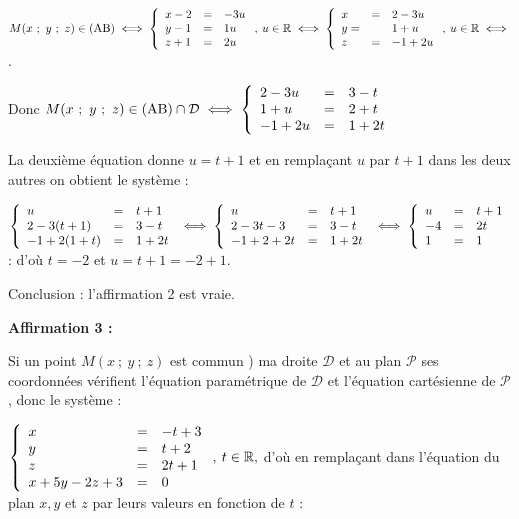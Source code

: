 \documentclass[10pt]{article}
\providecommand{\R}{\mathbb{R}}
\begin{document}
$M(x~;~y~;~z) \in (\text{AB}) \iff \left\{\begin{array}{l c l}
x - 2 &=& -3u\\
y - 1&=&1u\\
z + 1 &=&2u
\end{array}\right., \: u \in \R \iff \left\{\begin{array}{l c l}
x &=& 2  -3u\\
y =& &1 + u\\
z &=&- 1 + 2u
\end{array}\right., \: u \in \R \iff$.

Donc $M(x~;~y~;~z) \in (\text{AB}) \cap \mathcal{D} \iff \left\{\begin{array}{l c l}
2 - 3u	&=&3 - t\\
1 + u	&=&2 + t\\
- 1 + 2u&=&1 + 2t
\end{array}\right.$

La deuxième équation donne $u = t + 1$ et  en remplaçant $u$ par $t + 1$ dans les deux autres on obtient le système :

$\left\{\begin{array}{l c l}
u 				&=& t + 1\\
2 - 3(t + 1) 	&=& 3 - t\\
- 1 + 2(1 + t) 	&=&1 + 2t
\end{array}\right. \iff \left\{\begin{array}{l c l}
u 				&=& t + 1\\
2 - 3t - 3 		&=& 3 - t\\
- 1 + 2 + 2t 	&=&1 + 2t
\end{array}\right.\iff
\left\{\begin{array}{l c l}
u 	&=& t + 1\\
- 4	&=& 2t\\
1 	&=& 1
\end{array}\right.$ : d'où $t = - 2$ et $u = t + 1 = - 2 + 1$.

Conclusion : l'affirmation 2 est vraie.

\medskip

\textbf{Affirmation 3 :}


Si un point $M(x~;~y~;~z)$ est commun ) ma droite $\mathcal{D}$ et au plan $\mathcal{P}$ ses coordonnées vérifient l'équation paramétrique de $\mathcal{D}$ et l'équation cartésienne de $\mathcal{P}$, donc le système :

$\left\{\begin{array}{l c l}
x&=&-t +3\\
y&=&t+ 2\\
z &=& 2t +1\\
x + 5y - 2z + 3&=&0
\end{array}\right., \: t \in \R,$ d'où en remplaçant dans l'équation du plan $x, y$ et $z$ par leurs valeurs en fonction de $t$ :
\end{document}

